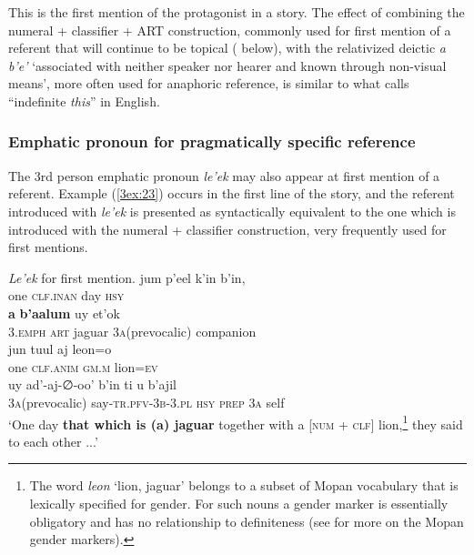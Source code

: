 \documentclass[output=paper]{langsci/langscibook}
\begin{document}
This is the first mention of the protagonist in a story.  The effect of combining the numeral + classifier + ART construction, commonly used for first mention of a referent that will continue to be topical ( below), with the relativized deictic {\emph{a b'e'}} `associated with neither speaker nor hearer and known through non-visual means', more often used for anaphoric reference, is similar to what \cite{prince:81} calls ``indefinite {\emph{this}}'' in English.

\subsubsection{Emphatic pronoun for pragmatically specific reference}\label{3sec:333}
\largerpage[1.5]
The 3rd person emphatic pronoun {\emph{le'ek}} may also appear at first mention of a referent. Example (\ref{3ex:23}) occurs in the first line of the story, and the referent introduced with {\emph{le'ek}} is presented as syntactically equivalent to the one which is introduced with the numeral + classifier construction, very frequently used for first mentions.


\begin{exe}
\ex\label{3ex:23}
{\emph{Le'ek}} for first mention.  
\exi{}
\gll	jum	p'eel 		k'in 	b'in, \\
	one	{\textsc{clf.inan}}	day	{\textsc{hsy}}	\\
\glt
\exi{}
 	{\textbf{a}} 	{\textbf{b'aalum}} 	uy				et'ok \\
	3.{\textsc{emph}}	{\textsc{art}}		jaguar		{\textsc{3a}}(prevocalic)	companion \\
\glt
\exi{}
\gll	jun 	tuul 			aj 			leon=o \\
	one	{\textsc{clf.anim}}	{\textsc{gm.m}}	lion={\textsc{ev}} \\
\glt 
\exi{}
\gll	uy				ad'-aj-∅-oo'	 			b'in 	ti	 		u	 	b’ajil \\
	{\textsc{3a}}(prevocalic)	say-{\textsc{tr.pfv-3b-3.pl}}	{\textsc{hsy}}	{\textsc{prep}}		{\textsc{3a}}	self \\
\glt `One day {\textbf{that which is (a) jaguar}} together with a [{\textsc{num}} + {\textsc{clf}}] lion,\footnote{The word {\emph{leon}} `lion, jaguar' belongs to a subset of Mopan vocabulary that is lexically specified for gender.  For such nouns a gender marker is essentially obligatory and has no relationship to definiteness (see \citealt{contini:morava:danziger:18} for more on the Mopan gender markers).} they said to each other ...'
\end{exe}
\clearpage
\end{document}
